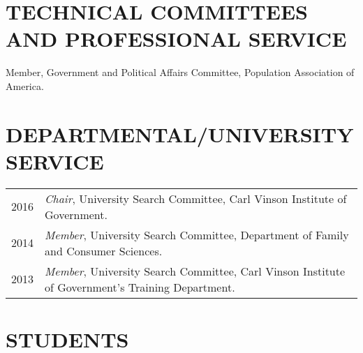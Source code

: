 \documentclass[letterpaper,11pt]{article}
\begin{document}
%




\section{TECHNICAL COMMITTEES AND PROFESSIONAL SERVICE}
Member, Government and Political Affairs Committee, Population Association of America.
% 


\section{DEPARTMENTAL/UNIVERSITY SERVICE}
\begin{tabularx}{\linewidth}{lX}
2016 & \textit{Chair}, University Search Committee, Carl Vinson Institute of Government.\\
2014 & \textit{Member}, University Search Committee, Department of Family and Consumer Sciences.\\
2013 & \textit{Member}, University Search Committee, Carl Vinson Institute of Government's Training Department.\\
\end{tabularx}

% 

\section{STUDENTS}


%
\end{document}
